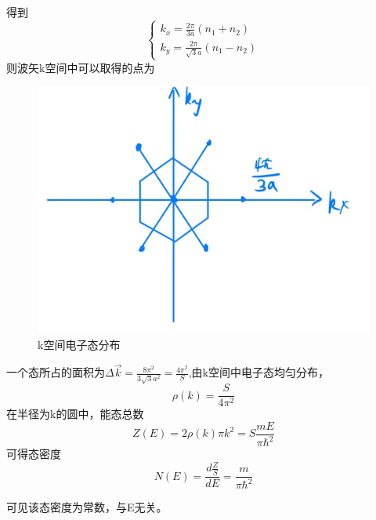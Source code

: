 \documentclass{article}
\begin{document}
得到
\begin{equation}
	\begin{cases}
		k_x=\frac{2\pi}{3a}(n_1+n_2)\\
		k_y=\frac{2\pi}{\sqrt{3}a}(n_1-n_2)
	\end{cases}
\end{equation}
则波矢k空间中可以取得的点为
	\begin{figure}[!h]
	
	\centering
	\includegraphics[scale=0.2]{k空间}
	\caption{\heiti{}k空间电子态分布}
	\label{fig:2}
\end{figure}
一个态所占的面积为$ \Delta\vec{k}=\frac{8\pi^2}{3\sqrt{3}a^2}=\frac{4\pi^2}{S} $,由k空间中电子态均匀分布，
\begin{equation}
	\rho(k)=\frac{S}{4\pi^2}
\end{equation}
在半径为k的圆中，能态总数
\begin{equation}
	Z(E)=2\rho(k)\pi k^2=S\frac{mE}{\pi\hbar^2}
\end{equation}
可得态密度
\begin{equation}
	N(E)=\dfrac{d\frac{Z}{S}}{dE}=\frac{m}{\pi\hbar^2}
\end{equation}


可见该态密度为常数，与E无关。
\end{document}
